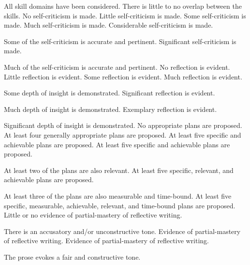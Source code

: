 \documentclass{../fal_assignment}
\begin{document}
\begin{markingrubric}
        \par 		All skill domains have been considered. There is little to no overlap between the skills.
%
        \grade\fail 	No self-criticism is made.
        \grade 		Little self-criticism is made.
        \grade 		Some self-criticism is made.
        \grade 		Much self-criticism is made.
        \grade 		Considerable self-criticism is made.
            \par 		Some of the self-criticism is accurate and pertinent.
        \grade 		Significant self-criticism is made.
            \par 		Much of the self-criticism is accurate and pertinent.
%
        \grade\fail 	No reflection is evident.
        \grade 		Little reflection is evident.
        \grade 		Some reflection is evident.
        \grade 		Much reflection is evident.
        \par 		Some depth of insight is demonstrated.
        \grade 		Significant reflection is evident.
        \par 		Much depth of insight is demonstrated.
        \grade 		Exemplary reflection is evident.
        \par 		Significant depth of insight is demonstrated.
%
        \grade\fail 	No appropriate plans are proposed.
        \grade 		At least four generally appropriate plans are proposed.
        \grade 		At least five specific and achievable plans are proposed. 
        \grade 		At least five specific and achievable plans are proposed. 
        \par 		At least two of the plans are also relevant.
        \grade 		At least five specific, relevant, and achievable plans are proposed. 
        \par 		At least three of the plans are also measurable and time-bound.
        \grade 		At least five specific, measurable, achievable, relevant, and time-bound plans are proposed. 
%
        \grade\fail 	Little or no evidence of partial-mastery of reflective writing.
         \par 		There is an accusatory and/or unconstructive tone.
        \grade 		Evidence of partial-mastery of reflective writing.
        \grade 		Evidence of partial-mastery of reflective writing.
         \par 		The prose evokes a fair and constructive tone.

\end{markingrubric}
\end{document}
